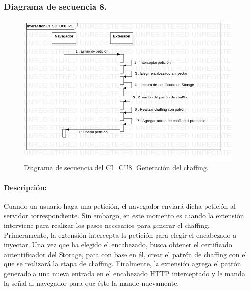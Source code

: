 \documentclass[12pt, a4paper, titlepage]{report}
\begin{document}
    			\subsubsection{Diagrama de secuencia 8.}
        			\begin{figure}[H]
        				\begin{center}    		    	\includegraphics[width=15cm]{./imagenes/Disenio/Componente_1/CI_SD_UC8_P1.png}
        				\caption[Diagrama de secuencia 8 del Componente I]{Diagrama de secuencia del CI\_CU8. Generación del chaffing.}
        				\end{center}
        			\end{figure}
        			
        			\paragraph{Descripción:}
        			Cuando un usuario haga una petición, el navegador enviará dicha petición al servidor correspondiente. Sin embargo, en este momento es cuando la extensión interviene para realizar los pasos necesarios para generar el chaffing. Primeramente, la extensión intercepta la petición para elegir el encabezado a inyectar. Una vez que ha elegido el encabezado, busca obtener el certificado autentificador del Storage, para con base en él, crear el patrón de chaffing con el que se realizará la etapa de chaffing. Finalmente, la extensión agrega el patrón generado a una nueva entrada en el encabezado HTTP interceptado y le manda la señal al navegador para que éste la mande nuevamente. 
    			
    			
\end{document}

